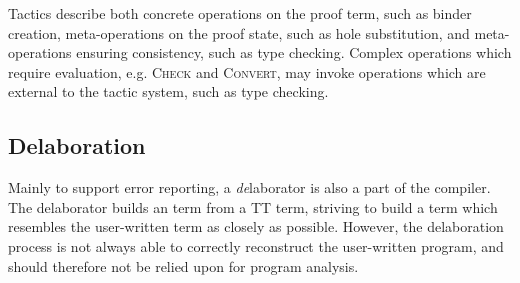 
Tactics describe both concrete operations on the proof term, such as binder
creation, meta-operations on the proof state, such as hole substitution, and
meta-operations ensuring consistency, such as type checking. Complex
operations which require evaluation, e.g. \textsc{Check} and \textsc{Convert},
may invoke operations which are external to the tactic system, such as type
checking.

\subsection{Delaboration}
Mainly to support error reporting, a \emph{de}laborator is also a part of the
compiler. The delaborator builds an \IdrisM{} term from a TT term, striving to
build a term which resembles the user-written term as closely as
possible. However, the delaboration process is not always able to correctly
reconstruct the user-written program, and should therefore not be relied upon
for program analysis.

